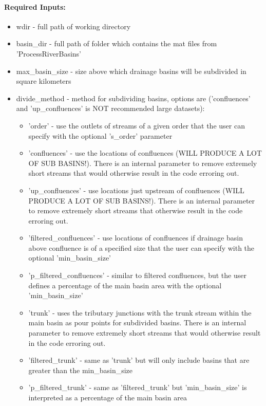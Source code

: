 \paragraph{Required Inputs:}
\begin{itemize}
\item wdir - full path of working directory
\item basin\_dir - full path of folder which contains the mat files from 'ProcessRiverBasins'
\item max\_basin\_size - size above which drainage basins will be subdivided in square kilometers
\item divide\_method - method for subdividing basins, options are ('confluences' and 'up\_confluences' is NOT recommended large datasets):
\begin{itemize}
\item 'order' - use the outlets of streams of a given order that the user can specify with the optional 's\_order' parameter 
\item 'confluences' - use the locations of confluences (WILL PRODUCE A LOT OF SUB BASINS!). There is an internal parameter to remove
extremely short streams that would otherwise result in the code erroring out.
\item 'up\_confluences' - use locations just upstream of confluences (WILL PRODUCE A LOT OF SUB BASINS!). There is an internal parameter
to remove extremely short streams that otherwise result in the code erroring out.
\item 'filtered\_confluences' - use locations of confluences if drainage basin above confluence is of a specified size that the user
can specify with the optional 'min\_basin\_size'  
\item 'p\_filtered\_confluences' - similar to filtered confluences, but the user defines a percentage of the main basin area
with the optional 'min\_basin\_size'
\item 'trunk' - uses the tributary junctions with the trunk stream within the main basin as pour points for subdivided basins. There is
an internal parameter to remove extremely short streams that would otherwise result in the code erroring out.
\item 'filtered\_trunk' - same as 'trunk' but will only include basins that are greater than the min\_basin\_size
\item 'p\_filtered\_trunk' - same as 'filtered\_trunk' but 'min\_basin\_size' is interpreted as a percentage of the main basin area
\end{itemize}
\end{itemize}

